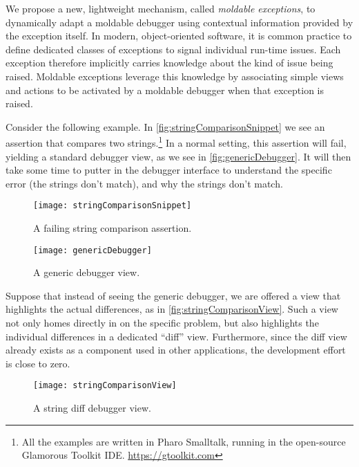 \documentclass[sigplan,anonymous,review,10pt]{acmart}
\newcommand\ac[1]{\nbc{AC}{#1}{teal}}
\begin{document}

We propose a new, lightweight mechanism, called \emph{moldable exceptions}, to dynamically adapt a moldable debugger using contextual information provided by the exception itself.
In modern, object-oriented software, it is common practice to define dedicated classes of exceptions to signal individual run-time issues.
Each exception therefore implicitly carries knowledge about the kind of issue being raised.
Moldable exceptions leverage this knowledge by associating simple views and actions to be activated by a moldable debugger when that exception is raised.

Consider the following example.
In \autoref{fig:stringComparisonSnippet} we see an assertion that compares two strings.\footnote{All the examples are written in Pharo Smalltalk, running in the open-source Glamorous Toolkit IDE. \url{https://gtoolkit.com}}
In a normal setting, this assertion will fail, yielding a standard debugger view, as we see in \autoref{fig:genericDebugger}.
It will then take some time to putter in the debugger interface to understand the specific error (the strings don't match), and why the strings don't match.
\begin{figure}[h]
  \texttt{[image: stringComparisonSnippet]}
  \caption{A failing string comparison assertion.}
  \label{fig:stringComparisonSnippet}
\end{figure}
\begin{figure}[h]
  \texttt{[image: genericDebugger]}
  \caption{A generic debugger view.}
  \label{fig:genericDebugger}
\end{figure}

Suppose that instead of seeing the generic debugger, we are offered a view that highlights the actual differences, as in \autoref{fig:stringComparisonView}.
Such a view not only homes directly in on the specific problem, but also highlights the individual differences in a dedicated ``diff'' view.
Furthermore, since the diff view already exists as a component used in other applications, the development effort is close to zero.
\begin{figure}[h]
  \texttt{[image: stringComparisonView]}
  \caption{A string diff debugger view.}
  \label{fig:stringComparisonView}
\end{figure}
\end{document}
